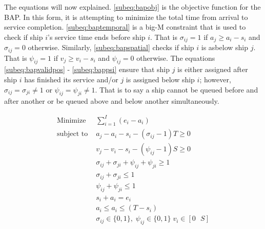 \documentclass[11pt,a4paper,final]{article}
\begin{document}
The equations will now explained. \autoref{subeq:bapobj} is the objective function for the BAP. In this form, it is
attempting to minimize the total time from arrival to service completion. \autoref{subeq:baptemporal} is a big-M
constraint that is used to check if ship \(i\)'s service time ends before ship \(i\). That is \(\sigma_{ij}=1\) if \(a_j \ge a_i -
s_i\) and \(\sigma_{ij} = 0\) otherwise. Similarly, \autoref{subeq:bapspatial} checks if ship \(i\) is asbelow ship \(j\). That is
\(\psi_{ij} = 1\) if \(v_j \ge v_i - s_i\) and \(\psi_{ij} = 0\) otherwise. The equations \autoref{subeq:bapvalidpos} -
\autoref{subeq:bappsi} ensure that ship \(j\) is either assigned after ship \(i\) has finished its service and/or \(j\) is
assigned below ship \(i\); however, \(\sigma_{ij} = \sigma_{ji} \ne 1\) or \(\psi_{ij} = \psi_{ji} \ne 1\). That is to say a ship cannot be queued
before and after another or be queued above and below another simultaneously.

\begin{subequations}
\label{eq:generalbap}
\label{eq:bapconstrs}
\begin{align}
    \text{Minimize }   & \sum_{i=1}^I (e_i - a_i)                                       \label{subeq:bapobj}    \\
    \text{subject to } &a_j - a_i - s_i - (\sigma_{ij} - 1)T \geq 0                         \label{subeq:baptemporal}         \\
                       &v_j - v_i - s_i - (\psi_{ij} - 1)S \geq 0                         \label{subeq:bapspatial}        \\
                       &\sigma_{ij} + \sigma_{ji} + \psi_{ij} + \psi_{ji} \geq 1                       \label{subeq:bapvalidpos}    \\
                       &\sigma_{ij} + \sigma_{ji} \leq 1                                         \label{subeq:bapsigma}        \\
                       &\psi_{ij} + \psi_{ji} \leq 1                                         \label{subeq:bappsi}        \\
                       &s_i + a_i = e_i                                             \label{subeq:bapdetach}       \\
                       &a_i \leq a_i \leq (T - s_i)                                       \label{subeq:bapvalidtime} \\
                       &\sigma_{ij} \in \{0,1\},\;\psi_{ij} \in \{0,1\}\; v_i \in [0 \mbox{ } S ] \label{subeq:bapspaces}
\end{align}
\end{subequations}
\end{document}
